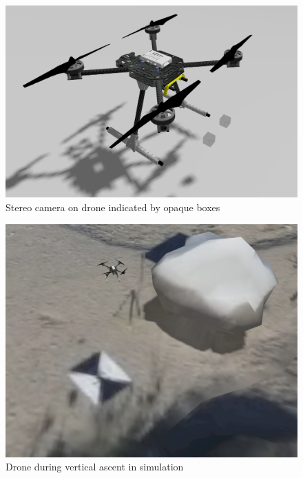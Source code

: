 \begin{figure}
    \centering
    \includegraphics[scale=0.32]{images/preparation/stereo/drone_with_stereo_cam.png}
    \caption{Stereo camera on drone indicated by opaque boxes}
\end{figure}

\begin{figure}
    \centering
    \includegraphics[scale=0.34]{images/preparation/stereo/ascent_sim.png}
    \caption{Drone during vertical ascent in simulation}
\end{figure}

